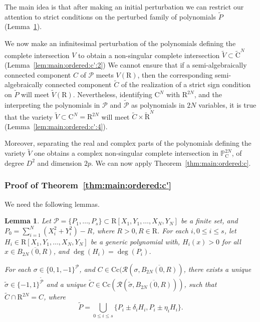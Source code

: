 \documentclass[10pt]{amsart}
\newtheorem{lemma}{Lemma}[section]
\theoremstyle{definition}
\theoremstyle{remark}
\numberwithin{equation}{section}
\newcommand {\R} {\mathrm{R}}
\newcommand {\C}     {\mathrm{C}}
\newcommand {\RR} {{\mathcal R}}
\newcommand {\PP}     {\mathbb{P}} %
\newcommand{\Cc}{\mathrm{Cc}}
\begin{document}
The main idea is that
after making an initial perturbation we can restrict our attention to strict conditions on the perturbed family of polynomials $\widetilde{P}$
(Lemma~\ref{lem:main:ordered:c':1}).

We now make an infinitesimal perturbation of the polynomials defining the complete intersection $V$ to obtain a non-singular complete intersection $\widetilde{V} \subset \widetilde{\C}^N$ 
(Lemma~\ref{lem:main:ordered:c':2})
We cannot ensure that
if a semi-algebraically connected component $C$ of $\mathcal{P}$ meets $V(\R)$, then
the corresponding semi-algebraically connected component $\widetilde{C}$ of the realization of a strict sign condition on $\widetilde{P}$ will meet $\widetilde{V}(\R)$. Nevertheless, identifying $\C^N$ with
$\R^{2N}$, and the interpreting the polynomials in $\mathcal{P}$ and $\widetilde{\mathcal{P}}$ as polynomials in $2N$ variables, it is true that 
the variety $\widetilde{V} \subset \C^N = \R^{2N}$ will meet 
$\widetilde{C} \times \widetilde{\R}^N$
(Lemma~\ref{lem:main:ordered:c':4}).

Moreover, separating the real and complex parts of the polynomials defining the variety $\widetilde{V}$ one obtains a complex non-singular complete intersection in $\PP^{2 N}_\C$, of degree 
$D^2$ and dimension $2p$. We can now apply Theorem~\ref{thm:main:ordered:c}.



\subsubsection{Proof of Theorem~\ref{thm:main:ordered:c'}}
We need the following lemmas.
\begin{lemma}
\label{lem:main:ordered:c':1}
    Let $\mathcal{P} = \{P_1,\ldots,P_s\} \subset \R[X_1,Y_1,\ldots,X_N,Y_N]$ be a finite set, and
    $P_0 = \sum_{i=1}^{N} (X_i^2 + Y_i^2) - R$, where $R >0, R\in \R$.
    For each $i,0 \leq i \leq s$, let $H_i \in \R[X_1,Y_1,\ldots,X_N,Y_N]$ be a generic polynomial with, $H_i(x) > 0$ for all $x \in \overline{B_{2N}(0,R)}$, and $\deg(H_i) = \deg(P_i)$. 
    
    For each $\sigma \in \{0,1,-1\}^{\mathcal{P}}$, and 
    $C \in \Cc(\RR(\sigma, \overline{B_{2 N}(0,R)})$, there exists
    a unique $\widetilde{\sigma} \in \{-1,1\}^{\widetilde{\mathcal{P}}}$ and 
    a unique 
    $\widetilde{C} \in \Cc(\RR(\widetilde{\sigma},\overline{B_{2N}(0,R)}))$,
    such that $\widetilde{C} \cap \R^{2N} = C$, 
    where 
    \[
    \widetilde{P} = \bigcup_{0 \leq i \leq s} \{P_i\pm \delta_i H_i, P_i \pm \eta_i H_i\}.
    \]
\end{lemma}
\end{document}
